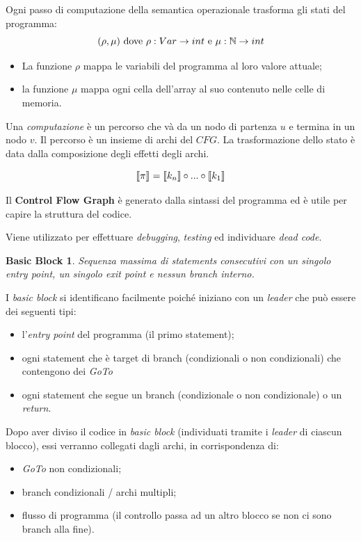 \documentclass[a4paper, 10pt]{book}
\begin{document}
Ogni passo di computazione della semantica operazionale trasforma gli stati del programma:
\begin{equation*}
	(\rho, \mu) \textnormal{ dove } \rho: Var \to int \textnormal{ e } \mu : \mathbb{N} \to int
\end{equation*}
\begin{itemize}
	\item La funzione $\rho$ mappa le variabili del programma al loro valore attuale;
	\item la funzione $\mu$ mappa ogni cella dell'array al suo contenuto nelle celle di memoria.
\end{itemize}

Una \textit{computazione} è un percorso che và da un nodo di partenza $u$ e termina in un nodo $v$. Il percorso è un insieme di archi del $CFG$. La trasformazione dello stato è data dalla composizione degli effetti degli archi.

\begin{equation*}
	\llbracket \pi\rrbracket\hspace{0.01cm} = \llbracket k_n\rrbracket \circ ... \circ \llbracket k_1\rrbracket
\end{equation*}

Il \textbf{Control Flow Graph} è generato dalla sintassi del programma ed è utile per capire la struttura del codice.

Viene utilizzato per effettuare \textit{debugging}, \textit{testing} ed individuare \textit{dead code}.

\newtheorem*{definit1}{Basic Block}
\begin{definit1}
	Sequenza massima di statements consecutivi con un singolo \textit{entry point}, un singolo \textit{exit point} e nessun \textit{branch} interno.
\end{definit1}

I \textit{basic block} si identificano facilmente poiché iniziano con un \textit{leader} che può essere dei seguenti tipi:
\begin{itemize}
	\item l'\textit{entry point} del programma (il primo statement);
	\item ogni statement che è target di branch (condizionali o non condizionali) che contengono dei \textit{GoTo}
	\item ogni statement che segue un branch (condizionale o non condizionale) o un \textit{return}.
\end{itemize}

Dopo aver diviso il codice in \textit{basic block} (individuati tramite i \textit{leader} di ciascun blocco), essi verranno collegati dagli archi, in corrispondenza di:
\begin{itemize}
	\item \textit{GoTo} non condizionali;
	\item branch condizionali / archi multipli;
	\item flusso di programma (il controllo passa ad un altro blocco se non ci sono branch alla fine).
\end{itemize}
\end{document}
